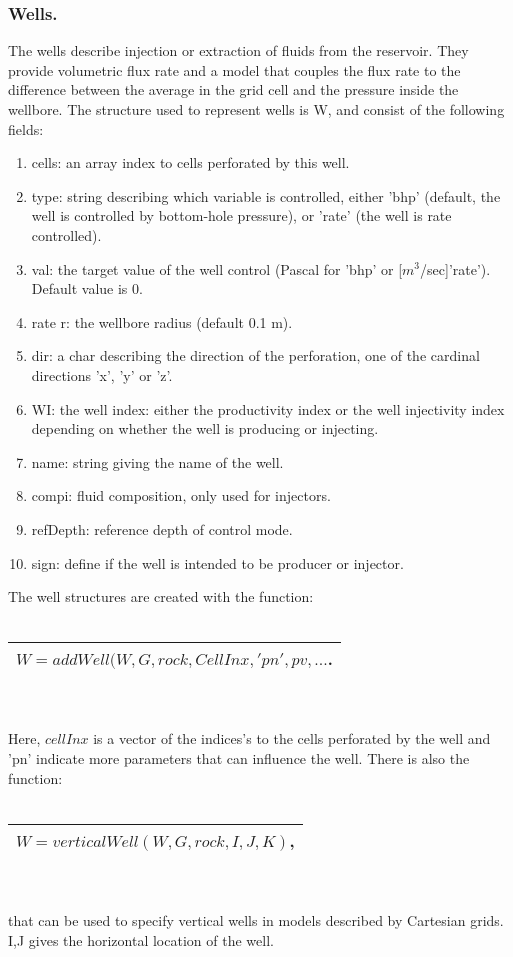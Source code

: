 \documentclass[12pt]{report}
\begin{document}
\subsubsection{Wells.}
The wells describe injection or extraction of fluids from the reservoir. They provide volumetric
flux rate and a model that couples the flux rate to the difference between the average in the grid cell
and the pressure inside the wellbore. The structure used to represent wells is W, and consist of 
the following fields:
\begin{enumerate}
\item cells: an array index to cells perforated by this well.
\item type: string describing which variable is controlled, either ’bhp’ (default, the well is controlled by bottom-hole pressure), or ’rate’ (the well is rate controlled).
\item val: the target value of the well control (Pascal for ’bhp’ or [$m^3$/sec]’rate’). Default value is 0.
\item rate r: the wellbore radius (default 0.1 m).
\item dir: a char describing the direction of the perforation, one of the cardinal
directions ’x’, ’y’ or ’z’.
\item WI: the well index: either the productivity index or the well injectivity index
depending on whether the well is producing or injecting.
\item name: string giving the name of the well.
\item compi: fluid composition, only used for injectors.
\item refDepth: reference depth of control mode.
\item sign: define if the well is intended to be producer or injector.
\end{enumerate}
The well structures are created with the function:\\\\
\begin{tabular}{|l|}
\hline
 $W=addWell(W,G,rock,CellInx, 'pn', pv,...$.\\
\hline
\end{tabular}
\\\\Here, $cellInx$ is a vector of the indices's to the cells perforated by the well and 'pn' indicate more 
parameters that can influence the well. 
There is also the function:\\\\
\begin{tabular}{|l|}
\hline
 $W=verticalWell(W,G,rock,I,J,K)$,\\
\hline
\end{tabular}
\\\\that can be used to specify vertical wells in models described by Cartesian
grids. I,J gives the horizontal location of the well.
\end{document}
